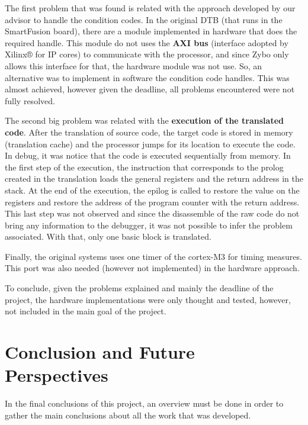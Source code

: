 \documentclass[12pt]{article}
\begin{document}
{The first problem that was found is related with the approach developed by our advisor to handle the condition codes. In the original DTB (that runs in the SmartFusion board), there are a module implemented in hardware that does the required handle. This module do not uses the \textbf{AXI bus} (interface adopted by Xilinx® for IP cores) to communicate with the processor, and since Zybo only allows this interface for that, the hardware module was not use. So, an alternative was to implement in software the condition code handles. This was almost achieved, however given the deadline, all problems encountered were not fully resolved.

The second big problem was related with the \textbf{execution of the translated code}. After the translation of source code, the target code is stored in memory (translation cache) and the processor jumps for its location to execute the code. In debug, it was notice that the code is executed sequentially from memory. In the first step of the execution, the instruction that corresponds to the prolog created in the translation loads the general registers and the return address in the stack. At the end of the execution, the epilog is called to restore the value on the registers and restore the address of the program counter with the return address. This last step was not observed and since the disassemble of the raw code do not bring any information to the debugger, it was not possible to infer the problem associated. With that, only one basic block is translated. 

Finally, the original systems uses one timer of the cortex-M3 for timing measures. This port was also needed (however not implemented) in the hardware approach.

To conclude, given the problems explained and mainly the deadline of the project, the hardware implementations were only thought and tested, however, not included in the main goal of the project.





\newpage
\section{Conclusion and Future Perspectives}

In the final conclusions of this project, an overview must be done in order to gather the main conclusions about all the work that was developed. 

}
\end{document}
